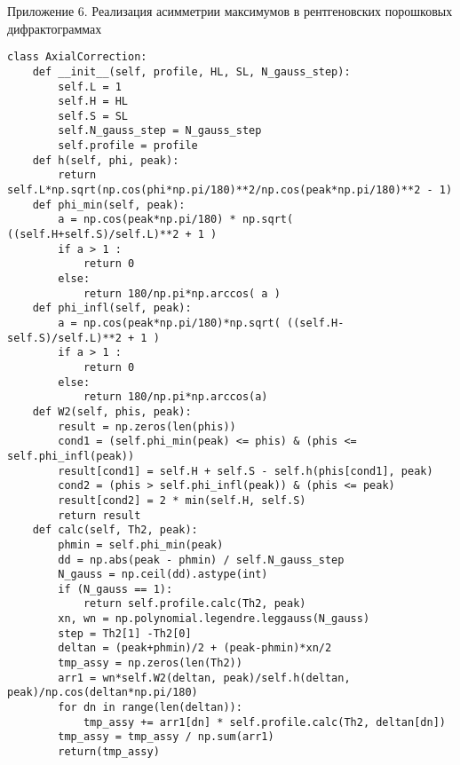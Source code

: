 \begin{center}
Приложение 6. Реализация асимметрии максимумов в рентгеновских порошковых дифрактограммах
\end{center}
\begin{verbatim}
class AxialCorrection:
    def __init__(self, profile, HL, SL, N_gauss_step):
        self.L = 1
        self.H = HL
        self.S = SL
        self.N_gauss_step = N_gauss_step
        self.profile = profile
    def h(self, phi, peak):
        return self.L*np.sqrt(np.cos(phi*np.pi/180)**2/np.cos(peak*np.pi/180)**2 - 1)
    def phi_min(self, peak):
        a = np.cos(peak*np.pi/180) * np.sqrt( ((self.H+self.S)/self.L)**2 + 1 )
        if a > 1 :
            return 0
        else:
            return 180/np.pi*np.arccos( a )
    def phi_infl(self, peak):
        a = np.cos(peak*np.pi/180)*np.sqrt( ((self.H-self.S)/self.L)**2 + 1 )
        if a > 1 :
            return 0
        else:
            return 180/np.pi*np.arccos(a)
    def W2(self, phis, peak):
        result = np.zeros(len(phis))
        cond1 = (self.phi_min(peak) <= phis) & (phis <= self.phi_infl(peak))
        result[cond1] = self.H + self.S - self.h(phis[cond1], peak)
        cond2 = (phis > self.phi_infl(peak)) & (phis <= peak)
        result[cond2] = 2 * min(self.H, self.S)
        return result
    def calc(self, Th2, peak):
        phmin = self.phi_min(peak)
        dd = np.abs(peak - phmin) / self.N_gauss_step
        N_gauss = np.ceil(dd).astype(int)
        if (N_gauss == 1):
            return self.profile.calc(Th2, peak)
        xn, wn = np.polynomial.legendre.leggauss(N_gauss)
        step = Th2[1] -Th2[0]
        deltan = (peak+phmin)/2 + (peak-phmin)*xn/2
        tmp_assy = np.zeros(len(Th2))
        arr1 = wn*self.W2(deltan, peak)/self.h(deltan, peak)/np.cos(deltan*np.pi/180)
        for dn in range(len(deltan)):
            tmp_assy += arr1[dn] * self.profile.calc(Th2, deltan[dn])
        tmp_assy = tmp_assy / np.sum(arr1)
        return(tmp_assy)
\end{verbatim}
\newpage

